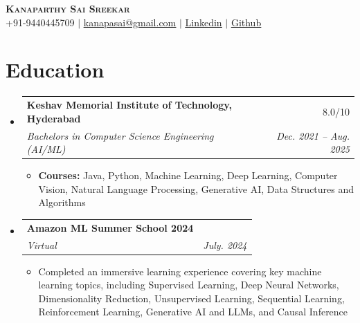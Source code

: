 \documentclass[letterpaper,11pt]{article}
\makeatletter
\newcommand{\resumeItem}[1]{
  \item\small{
    {#1 \vspace{-2pt}}
  }
}
\newcommand{\resumeSubheading}[4]{
  \vspace{-2pt}\item
    \begin{tabular*}{0.97\textwidth}[t]{l@{\extracolsep{\fill}}r}
      \textbf{#1} & #2 \\
      \textit{\small#3} & \textit{\small #4} \\
    \end{tabular*}\vspace{-7pt}
}
\newcommand{\resumeProjectHeading}[2]{
    \item
    \begin{tabular*}{0.97\textwidth}{l@{\extracolsep{\fill}}r}
      \small#1 & #2 \\
    \end{tabular*}\vspace{-7pt}
}
\newcommand{\resumeSubHeadingListStart}{\begin{itemize}[leftmargin=0.15in, label={}]}
\newcommand{\resumeSubHeadingListEnd}{\end{itemize}}
\newcommand{\resumeItemListStart}{\begin{itemize}}
\newcommand{\resumeItemListEnd}{\end{itemize}\vspace{-5pt}}
\makeatother
\begin{document}
\begin{center}
    \textbf{\Huge \scshape \textcolor{blue(pigment)}{Kanaparthy Sai Sreekar}} \\ \vspace{7pt}
    \small +91-9440445709 $|$ \href{mailto:kanapasai@gmail.com}{\underline{kanapasai@gmail.com}} $|$
    \href{https://www.linkedin.com/in/saisreekarkanaparthy/}{\underline{Linkedin}} $|$
    \href{https://github.com/KanaparthySaiSreekar}{\underline{Github}}
\end{center}

\section{\textcolor{blue(pigment)}{Education}}
  \resumeSubHeadingListStart
    \resumeSubheading
      {Keshav Memorial Institute of Technology, Hyderabad}{8.0/10}
      {Bachelors in Computer Science Engineering (AI/ML)}{Dec. 2021 -- Aug. 2025}
      \resumeItemListStart
        \resumeItem{\textbf{Courses:} Java, Python, Machine Learning, Deep Learning, Computer Vision, Natural Language Processing, Generative AI, Data Structures and Algorithms}
      \resumeItemListEnd
    \resumeSubheading
      {Amazon ML Summer School 2024}{}
      {Virtual}{July. 2024}
      \resumeItemListStart
       \resumeItem{ Completed an immersive learning experience covering key machine learning topics, including Supervised Learning,
     Deep Neural Networks, Dimensionality Reduction, Unsupervised Learning, Sequential Learning, Reinforcement
     Learning, Generative AI and LLMs, and Causal Inference}
      \resumeItemListEnd
  \resumeSubHeadingListEnd




\end{document}
